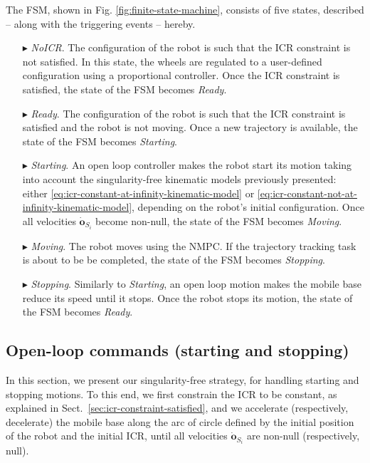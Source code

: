 The FSM, shown in Fig. \ref{fig:finite-state-machine}, consists of five states,
described -- along with the triggering events -- hereby.
\begin{itemize}
    \item[$\blacktriangleright$] \textit{NoICR}. The configuration of the robot
        is such that the ICR constraint is not satisfied. In this state, the
        wheels are regulated to a user-defined configuration using a
        proportional controller. Once the ICR constraint is satisfied,
        the state of the FSM becomes \textit{Ready}.

    \item[$\blacktriangleright$] \textit{Ready}. The configuration of the robot
        is such that the ICR constraint is satisfied and the robot is not
        moving. Once a new trajectory is available, the state of the FSM
        becomes \textit{Starting}.
    
    \item[$\blacktriangleright$] \textit{Starting}. An open loop controller
        makes the robot start its motion taking into account the
        singularity-free kinematic models previously presented: either
        \eqref{eq:icr-constant-at-infinity-kinematic-model} or
        \eqref{eq:icr-constant-not-at-infinity-kinematic-model},
        depending on the robot's initial configuration. Once all velocities
        $\dot{\bm{o}}_{S_i}$ become non-null, the state of the FSM becomes
        \textit{Moving}.
    
    \item[$\blacktriangleright$] \textit{Moving}. The robot moves using the
        NMPC. If the trajectory tracking task is about to be be completed,
        the state of the FSM becomes \textit{Stopping}.

    \item[$\blacktriangleright$] \textit{Stopping}. Similarly to
        \textit{Starting}, an open loop motion makes the mobile base reduce
        its speed until it stops. Once the robot stops its motion, the state
        of the FSM becomes \textit{Ready}.
\end{itemize}

\subsection{Open-loop commands (starting and stopping)}
\label{sec:starting-and-stopping}
In this section, we present our singularity-free strategy, for handling
starting and stopping motions. To this end, we first constrain the ICR to be
constant, as explained in Sect.~\ref{sec:icr-constraint-satisfied}, and we
accelerate (respectively, decelerate) the mobile base along the arc of circle
defined by the initial position of the robot and the initial ICR, until all
velocities $\dot{\bm{o}}_{S_i}$ are non-null (respectively, null).

